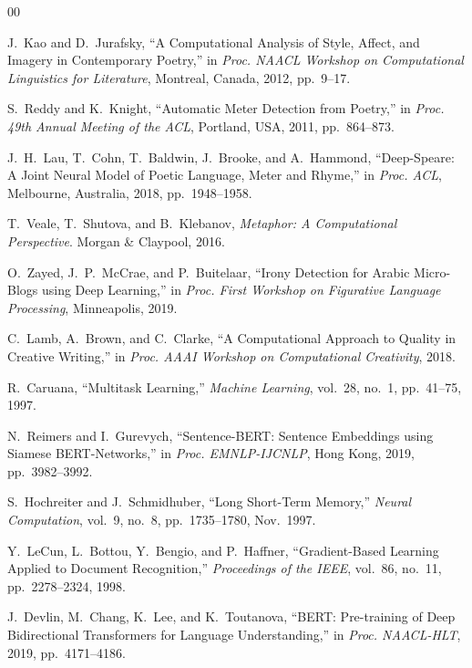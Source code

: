 \documentclass[conference]{IEEEtran}
\begin{document}
\begin{thebibliography}{00}

J.~Kao and D.~Jurafsky, ``A Computational Analysis of Style, Affect, and
Imagery in Contemporary Poetry,'' in \textit{Proc. NAACL Workshop on
Computational Linguistics for Literature}, Montreal, Canada, 2012,
pp.~9--17.

S.~Reddy and K.~Knight, ``Automatic Meter Detection from Poetry,'' in
\textit{Proc. 49th Annual Meeting of the ACL}, Portland, USA, 2011,
pp.~864--873.

J.~H.~Lau, T.~Cohn, T.~Baldwin, J.~Brooke, and A.~Hammond, ``Deep-Speare:
A Joint Neural Model of Poetic Language, Meter and Rhyme,'' in \textit{Proc.
ACL}, Melbourne, Australia, 2018, pp.~1948--1958.

T.~Veale, T.~Shutova, and B.~Klebanov, \textit{Metaphor: A Computational
Perspective}. Morgan \& Claypool, 2016.

O.~Zayed, J.~P.~McCrae, and P.~Buitelaar, ``Irony Detection for Arabic
Micro-Blogs using Deep Learning,'' in \textit{Proc. First Workshop on
Figurative Language Processing}, Minneapolis, 2019.

C.~Lamb, A.~Brown, and C.~Clarke, ``A Computational Approach to Quality in
Creative Writing,'' in \textit{Proc. AAAI Workshop on Computational
Creativity}, 2018.

R.~Caruana, ``Multitask Learning,'' \textit{Machine Learning}, vol.~28,
no.~1, pp.~41--75, 1997.

N.~Reimers and I.~Gurevych, ``Sentence-BERT: Sentence Embeddings using
Siamese BERT-Networks,'' in \textit{Proc. EMNLP-IJCNLP}, Hong Kong, 2019,
pp.~3982--3992.

S.~Hochreiter and J.~Schmidhuber, ``Long Short-Term Memory,''
\textit{Neural Computation}, vol.~9, no.~8, pp.~1735--1780, Nov.~1997.

Y.~LeCun, L.~Bottou, Y.~Bengio, and P.~Haffner, ``Gradient-Based Learning
Applied to Document Recognition,'' \textit{Proceedings of the IEEE},
vol.~86, no.~11, pp.~2278--2324, 1998.

J.~Devlin, M.~Chang, K.~Lee, and K.~Toutanova, ``BERT: Pre-training of Deep
Bidirectional Transformers for Language Understanding,'' in \textit{Proc.
NAACL-HLT}, 2019, pp.~4171--4186.


\end{thebibliography}
\end{document}
